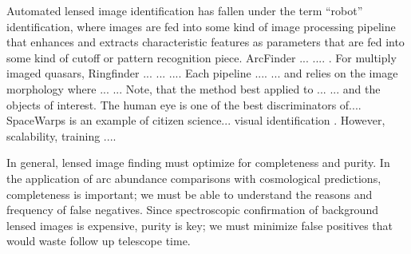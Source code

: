 \documentclass{emulateapj}
\begin{document}
Automated lensed image identification has fallen under the term
``robot'' identification, where images are fed into some kind of image
processing pipeline that enhances and extracts characteristic features
as parameters that are fed into some kind of cutoff or pattern
recognition piece.  ArcFinder
... .... \citep{seidelandbartelmann_07}. For multiply imaged quasars,
Ringfinder ... ... ...\citep{gavazzi_etal14}.  Each pipeline
.... ... and relies on the image morphology where ... ...  Note, that
the method best applied to ... ... and the objects of interest.  The
human eye is one of the best discriminators of.... SpaceWarps is an
example of citizen science... visual identification
\citep{marshall_etal16,more_etal16}.  However, scalability, training
....

In general, lensed image finding must optimize for completeness and
purity.  In the application of arc abundance comparisons with
cosmological predictions, completeness is important; we must be able
to understand the reasons and frequency of false negatives.  Since
spectroscopic confirmation of background lensed images is expensive,
purity is key; we must minimize false positives that would waste
follow up telescope time.




\end{document}
